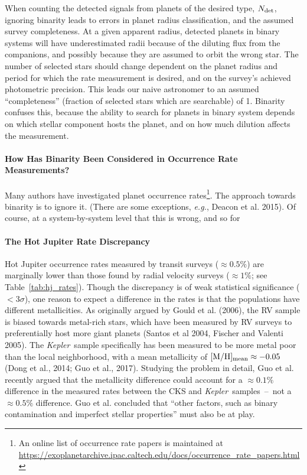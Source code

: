 When counting the detected signals from planets of the desired 
type, $N_{\rm det}$, ignoring binarity leads to errors in planet radius 
classification, and the assumed survey completeness.
At a given apparent radius, detected planets in binary systems will have 
underestimated radii because of the diluting flux from the companions, and 
possibly because they are assumed to orbit the wrong star.
The number of selected stars should change dependent on the planet radius 
and period for which the rate measurement is desired, and on the survey's 
achieved photometric precision.
This leads our naive astronomer to an assumed ``completeness'' (fraction of 
selected stars which are searchable) of 1.
Binarity confuses this, because the ability to search for planets 
in binary system depends on which stellar component hosts the planet, and on 
how much dilution affects the measurement.

\paragraph{How Has Binarity Been Considered in Occurrence Rate Measurements?}
Many authors have investigated planet occurrence rates\footnote{
    An online list of occurrence rate papers is maintained at 
    \url{https://exoplanetarchive.ipac.caltech.edu/docs/occurrence_rate_papers.html}
}.
The approach towards binarity is to ignore it.
(There are some exceptions, {\it e.g.}, Deacon et al. 2015).
Of course, at a system-by-system level that this is wrong, and so for   


\paragraph{The Hot Jupiter Rate Discrepancy}

Hot Jupiter occurrence rates measured by transit surveys ($\approx 0.5\%$) are 
marginally lower than those found by radial velocity surveys ($\approx 1\%$; 
see Table~\ref{tab:hj_rates}).
Though the discrepancy is of weak statistical significance ($<3\sigma$),
one reason to expect a difference in the rates is that the populations have 
different metallicities.
As originally argued by Gould et al. (2006), the RV sample is biased towards 
metal-rich stars, which have been measured by RV surveys to preferentially 
host more giant planets (Santos et al 2004, Fischer and Valenti 2005).
The {\it Kepler}\ sample specifically has been measured to be more metal poor 
than the local neighborhood, with a mean metallicity of $[{\rm M/H}]_{\rm 
mean}\approx -0.05$ (Dong et al., 2014; Guo et al., 2017).
Studying the problem in detail, Guo et al. recently argued that the 
metallicity difference could account for a $\approx 0.1\%$ difference in the 
measured rates between the CKS and {\it Kepler}\ samples~--~not a $\approx 
0.5\%$ difference.
Guo et al. concluded that ``other factors, such as binary contamination and 
imperfect stellar properties'' must also be at play.

